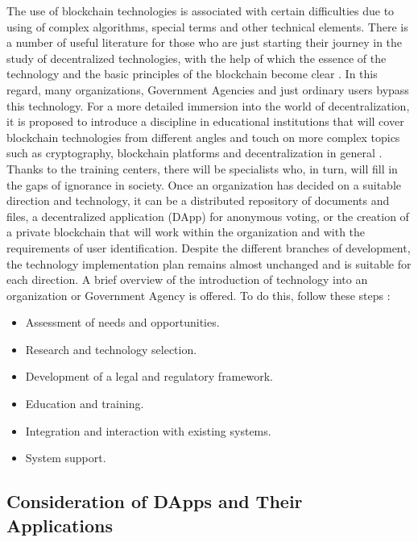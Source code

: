 \documentclass[10pt,conference,a4paper]{IEEEtran_EDM}
\begin{document}
The use of blockchain technologies is associated with certain difficulties due to using of complex algorithms, special terms and other technical elements.
There is a number of useful literature for those who are just starting their journey in the study of decentralized technologies, with the help of which the essence of the technology and the basic principles of the blockchain become clear \cite{Kube}.
In this regard, many organizations, Government Agencies and just ordinary users bypass this technology.
For a more detailed immersion into the world of decentralization, it is proposed to introduce a discipline in educational institutions that will cover blockchain technologies from different angles and touch on more complex topics such as cryptography, blockchain platforms and decentralization in general \cite{Bashir}.
Thanks to the training centers, there will be specialists who, in turn, will fill in the gaps of ignorance in society.
Once an organization has decided on a suitable direction and technology, it can be a distributed repository of documents and files, a decentralized application (DApp) for anonymous voting, or the creation of a private blockchain that will work within the organization and with the requirements of user identification.
Despite the different branches of development, the technology implementation plan remains almost unchanged and is suitable for each direction.
A brief overview of the introduction of technology into an organization or Government Agency is offered.
To do this, follow these steps \cite{Talapina}:
\begin{itemize}
    \item Assessment of needs and opportunities.
    \item Research and technology selection.
    \item Development of a legal and regulatory framework.
    \item Education and training.
    \item Integration and interaction with existing systems.
    \item System support.
\end{itemize}

\subsection{Consideration of DApps and Their Applications}
\end{document}
